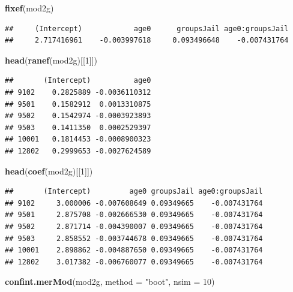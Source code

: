 \documentclass[]{article}
\newenvironment{Shaded}{\begin{snugshade}}{\end{snugshade}}
\newcommand{\KeywordTok}[1]{\textcolor[rgb]{0.13,0.29,0.53}{\textbf{{#1}}}}
\newcommand{\DataTypeTok}[1]{\textcolor[rgb]{0.13,0.29,0.53}{{#1}}}
\newcommand{\DecValTok}[1]{\textcolor[rgb]{0.00,0.00,0.81}{{#1}}}
\newcommand{\StringTok}[1]{\textcolor[rgb]{0.31,0.60,0.02}{{#1}}}
\newcommand{\NormalTok}[1]{{#1}}
\begin{document}
\small

\begin{Shaded}
\begin{Highlighting}[]
\KeywordTok{fixef}\NormalTok{(mod2g)}
\end{Highlighting}
\end{Shaded}

\begin{verbatim}
##     (Intercept)            age0      groupsJail age0:groupsJail 
##     2.717416961    -0.003997618     0.093496648    -0.007431764
\end{verbatim}

\small

\begin{Shaded}
\begin{Highlighting}[]
\KeywordTok{head}\NormalTok{(}\KeywordTok{ranef}\NormalTok{(mod2g)[[}\DecValTok{1}\NormalTok{]])}
\end{Highlighting}
\end{Shaded}

\begin{verbatim}
##       (Intercept)          age0
## 9102    0.2825889 -0.0036110312
## 9501    0.1582912  0.0013310875
## 9502    0.1542974 -0.0003923893
## 9503    0.1411350  0.0002529397
## 10001   0.1814453 -0.0008900323
## 12802   0.2999653 -0.0027624589
\end{verbatim}

\begin{Shaded}
\begin{Highlighting}[]
\KeywordTok{head}\NormalTok{(}\KeywordTok{coef}\NormalTok{(mod2g)[[}\DecValTok{1}\NormalTok{]])}
\end{Highlighting}
\end{Shaded}

\begin{verbatim}
##       (Intercept)         age0 groupsJail age0:groupsJail
## 9102     3.000006 -0.007608649 0.09349665    -0.007431764
## 9501     2.875708 -0.002666530 0.09349665    -0.007431764
## 9502     2.871714 -0.004390007 0.09349665    -0.007431764
## 9503     2.858552 -0.003744678 0.09349665    -0.007431764
## 10001    2.898862 -0.004887650 0.09349665    -0.007431764
## 12802    3.017382 -0.006760077 0.09349665    -0.007431764
\end{verbatim}

\small

\begin{Shaded}
\begin{Highlighting}[]
\KeywordTok{confint.merMod}\NormalTok{(mod2g, }\DataTypeTok{method =} \StringTok{"boot"}\NormalTok{, }\DataTypeTok{nsim =} \DecValTok{10}\NormalTok{)}
\end{Highlighting}
\end{Shaded}
\end{document}
